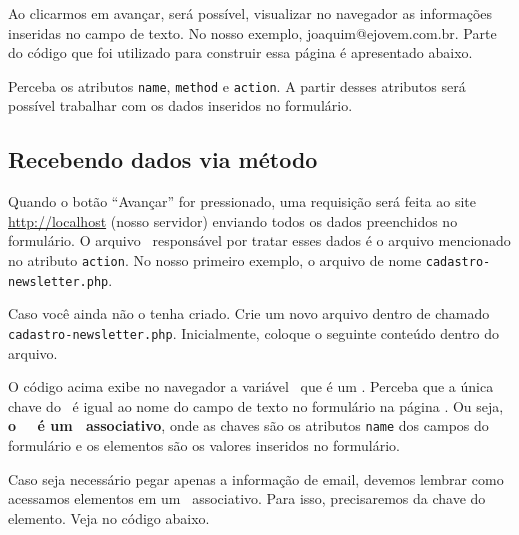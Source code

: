 
Ao clicarmos em avançar, será possível, visualizar no navegador as informações inseridas no campo
de texto. No nosso exemplo, joaquim@ejovem.com.br. Parte do código que foi utilizado para
construir essa página é apresentado abaixo.



Perceba os atributos \texttt{name}, \texttt{method} e \texttt{action}. A partir desses
atributos será possível trabalhar com os dados inseridos no formulário.

\subsection{Recebendo dados via método \metodoGET}
\label{recebendo-dados-via-metodo-get}

Quando o botão ``Avançar'' for pressionado, uma requisição será feita ao site 
\url{http://localhost} (nosso servidor) enviando todos os dados preenchidos no
formulário. O arquivo \phpextensao~responsável por tratar esses dados é o arquivo
mencionado no atributo \texttt{action}. No nosso primeiro exemplo, o arquivo de nome
\texttt{cadastro-newsletter.php}.

Caso você ainda não o tenha criado. Crie um novo arquivo dentro de 
chamado \texttt{cadastro-newsletter.php}. Inicialmente, coloque o seguinte conteúdo dentro do arquivo.



O código acima exibe no navegador a variável \variavelget~que é um \tipoarray. Perceba que a
única chave do \tipoarray~é igual ao nome do campo de texto no formulário na página \html.
Ou seja, \textbf{o \tipoarray~\variavelget~é um \tipoarray~associativo}, onde as chaves são
os atributos \texttt{name} dos campos do formulário e os elementos são os valores inseridos
no formulário.


Caso seja necessário pegar apenas a informação de email, devemos lembrar como acessamos 
elementos em um \tipoarray~associativo. Para isso, precisaremos da chave do elemento. Veja
no código abaixo.



